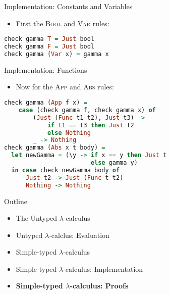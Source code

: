 \documentclass[leqno,presentation,usenames,dvipsnames]{beamer}
\begin{document}
\begin{frame}[fragile]{Implementation: Constants and Variables}
    \begin{itemize}
        \item First the \textsc{Bool} and \textsc{Var} rules:
    \end{itemize}
\begin{lstlisting}[language=haskell, basicstyle=\small\ttfamily]
check gamma T = Just bool
check gamma F = Just bool
check gamma (Var x) = gamma x
\end{lstlisting}
\end{frame}

\begin{frame}[fragile]{Implementation: Functions}
    \begin{itemize}
        \item Now for the \textsc{App} and \textsc{Abs} rules:
    \end{itemize}
\begin{lstlisting}[language=haskell, basicstyle=\small\ttfamily]
check gamma (App f x) =
    case (check gamma f, check gamma x) of
        (Just (Func t1 t2), Just t3) ->
            if t1 == t3 then Just t2
            else Nothing
        _ -> Nothing
check gamma (Abs x t body) =
  let newGamma = (\y -> if x == y then Just t
                        else gamma y)
  in case check newGamma body of
      Just t2 -> Just (Func t t2)
      Nothing -> Nothing
\end{lstlisting}
\end{frame}

\begin{frame}{Outline}
    \begin{itemize}
        \item The Untyped $\lambda$-calculus
        \item Untyped $\lambda$-calclus: Evaluation
        \item Simple-typed $\lambda$-calculus
        \item Simple-typed $\lambda$-calculus: Implementation
        \item \textbf{Simple-typed $\lambda$-calculus: Proofs}
    \end{itemize}
\end{frame}
\end{document}
